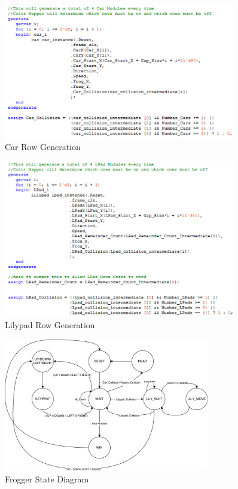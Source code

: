 \documentclass[journal, twocolumn, final,11pt,letterpaper]{IEEEtran}
\begin{document}
\begin{figure}[H]
	\centering
	\includegraphics[width=0.9\textwidth]{car_row_generation.png}
	\caption{Car Row Generation}
	\label{fig:car-row-generation}
\end{figure}

\begin{figure}[H]
	\centering
	\includegraphics[width=0.9\textwidth]{lpad_row_generation.png}
	\caption{Lilypad Row Generation}
	\label{fig:lpad-row-generation}
\end{figure}


\begin{figure}[H]
	\centering
	\includegraphics[width=0.8\textwidth]{frogger_state_diagram.png}
	\caption{Frogger State Diagram}
	\label{fig:frogger-state}
\end{figure}
\end{document}
